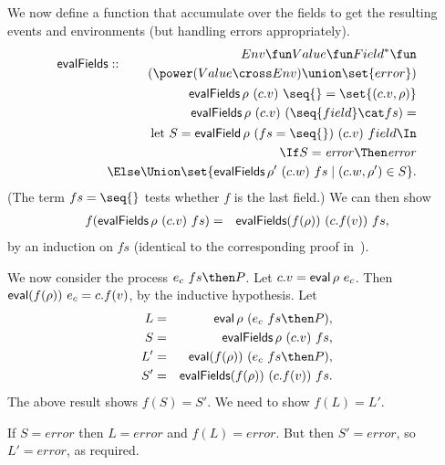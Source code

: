 We now define a function that accumulate over the fields to get the
resulting events and environments (but handling errors appropriately).
\[
\begin{align}
\evalFields :: 
  \begin{align}
  Env \fun  Value \fun Field^* \fun \\
  \qquad (\power (Value \cross Env) \union \set{error})
  \end{align} \\
\evalFields \rho~(c.v)~\seq{} = \set{(c.v,\rho)} \\
\evalFields \rho~(c.v)~(\seq{field} \cat fs)  = \\
\qquad
  \begin{align}
  \Let S = \evalField \rho~(fs=\seq{})~(c.v)~field \In \\
  \If S = \error \Then \error \\
  \Else \Union \set{ \evalFields \rho'~(c.w)~fs \mid  (c.w, \rho') \in S }.
  \end{align}
\end{align}
\]
(The term $fs=\seq{}$ tests whether $f$ is the last field.)
We can then show 
\begin{eqnarray*}%
f(\evalFields \rho~(c.v)~fs) & = & 
  \evalFields (f(\rho))~(c.f(v))~fs ,
\end{eqnarray*}
%
by an induction on $fs$ (identical to the corresponding proof
in~\cite{symmetry-reduction}). 


We now consider the process $e_c~ fs \then P$.  
Let $c.v = \mathop{\sf eval} \rho~e_c$.  Then
$\mathop{\sf eval} (f(\rho))~e_c = c.f(v)$, by the inductive hypothesis. 
Let
%
\begin{eqnarray*}
L & = & \eval \rho~ (e_c~ fs \then P), \\
S & = & \evalFields \rho~(c.v)~fs, \\
L' & = &  \eval (f(\rho))~ (e_c~fs \then P), \\
S' & = & \evalFields (f(\rho))~(c.f(v))~fs.
\end{eqnarray*}%
%
The above result shows $f(S) = S'$.  We need to show $f(L) = L'$.

If $S = error$ then $L = error$ and $f(L) = error$.  But then $S' = error$,
so $L' = error$, as required. 

